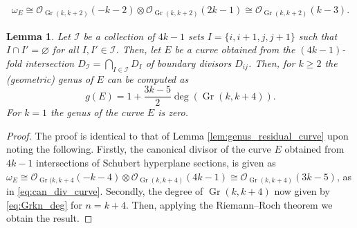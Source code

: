 \documentclass[10pt,a4paper]{amsart}
\newtheorem{lemma}{Lemma}
\DeclareMathOperator{\gr}{Gr}
\newcommand{\grk}{\operatorname{Gr}(k,k+2)}
\begin{document}
    \begin{align}\label{eq:can_div_curve}
    \omega_E\cong \mathcal{O}_{\grk}(-k-2)\otimes\mathcal{O}_{\grk}(2k-1)\cong \mathcal{O}_{\grk}(k-3).
    \end{align}

\begin{lemma}\label{lem:m=4_genus_residual_curve}
    Let $\mathcal{I}$ be a collection of $4k-1$ sets $I=\{i,i+1,j,j+1\}$ such that $I\cap I'=\varnothing$ for all $I,I'\in \mathcal{I}$.
    Then, let $E$ be a curve obtained from the $(4k-1)$-fold intersection $D_{\mathcal{I}}=\bigcap_{I\in \mathcal{I}}D_I$ of boundary divisors $D_{ij}$.
    Then, for $k\geq 2$ the (geometric) genus of $E$  can be computed as 
    \[
    g(E)=1+\frac{3k-5}{2}\deg(\gr(k,k+4)).
    \]
    For $k=1$ the genus of the curve $E$ is zero.
\end{lemma}

\begin{proof}
    The proof is identical to that of Lemma \ref{lem:genus_residual_curve} upon noting the following.
    Firstly, the canonical divisor of the curve $E$ obtained from $4k-1$ intersections of Schubert hyperplane sections, is given as $\omega_E\cong \mathcal{O}_{\gr(k,k+4}(-k-4)\otimes \mathcal{O}_{\gr(k,k+4)}(4k-1)\cong \mathcal{O}_{\gr(k,k+4)}(3k-5)$, as in \eqref{eq:can_div_curve}.
    Secondly, the degree of $\gr(k,k+4)$ now given by \eqref{eq:Grkn_deg} for $n=k+4$.
    Then, applying the Riemann--Roch theorem we obtain the result.
\end{proof}
\end{document}
